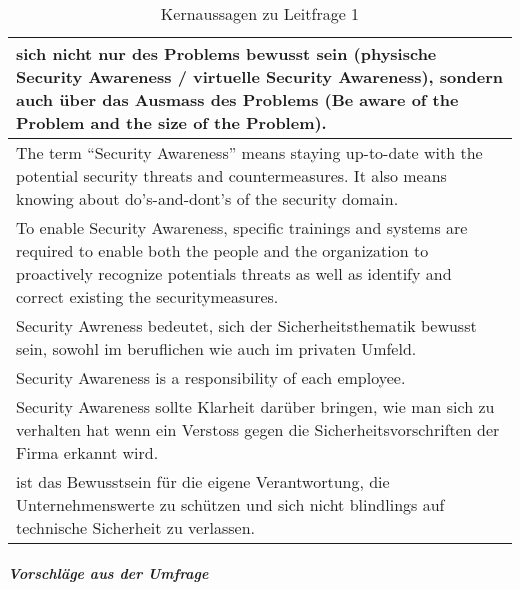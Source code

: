 \documentclass[../../main.tex]{subfiles}
\begin{document}
\begin{table}[H]
\tablefontsize	
\caption{Kernaussagen zu Leitfrage 1}
\label{kernaussagen_leitfrage1}


\begin{tabular}{ |p{\textwidth-1cm}| }



\hline
[\dots]sich nicht nur des Problems bewusst sein (physische Security Awareness / virtuelle Security Awareness), sondern auch über das Ausmass des Problems (Be aware of the Problem and the size of the Problem).\\ 
\hline
The term "`Security Awareness"' means staying up-to-date with the potential security threats and countermeasures. It also means knowing about do's-and-dont's of the security domain.\\
\hline
To enable Security Awareness, specific trainings and systems are required to enable both the people and the organization to proactively recognize potentials threats as well as identify and correct existing the securitymeasures. \\ 
\hline
Security Awreness bedeutet, sich der Sicherheitsthematik bewusst sein, sowohl im beruflichen wie auch im privaten Umfeld. \\ 
\hline
Security Awareness is a responsibility of each employee.\\ 
\hline
Security Awareness sollte Klarheit darüber bringen, wie man sich zu verhalten hat wenn ein Verstoss gegen die Sicherheitsvorschriften der Firma erkannt wird. \\ 
\hline
[\dots]ist das Bewusstsein für die eigene Verantwortung, die Unternehmenswerte zu schützen und sich nicht blindlings auf technische Sicherheit zu verlassen. \\ 
\hline

\end{tabular}
\end{table}

\subparagraph*{Vorschläge aus der Umfrage}\mbox{}


\sloppy 
\end{document}
